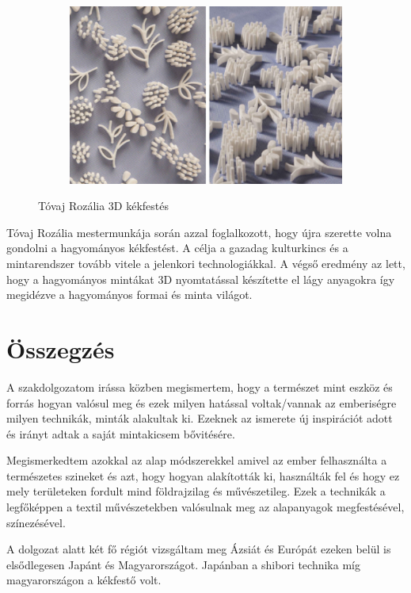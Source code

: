 \documentclass[fontsize=12pt, appendixprefix=true]{scrreprt}
\begin{document}
\begin{figure}[ht!]
	\begin{subfigure}[b]{0.3\linewidth}
		\includegraphics[width=\linewidth]{img/tr_03.png}
		\caption{}
	  \end{subfigure}
	\caption{Tóvaj Rozália 3D kékfestés}
	\label{fig:tr}
  \end{figure}

  Tóvaj Rozália mestermunkája \cite{tovaj2018} során azzal foglalkozott, hogy újra szerette volna gondolni a hagyományos kékfestést. A célja a gazadag kulturkincs és a mintarendszer tovább vitele a jelenkori technologiákkal. A végső eredmény az lett, hogy a hagyományos mintákat 3D nyomtatással készítette el lágy anyagokra így megidézve a hagyományos formai és minta világot.

\chapter{Összegzés} 
A szakdolgozatom irássa közben megismertem, hogy a természet mint eszköz és forrás hogyan valósul meg és ezek milyen hatással voltak/vannak az emberiségre milyen technikák, minták alakultak ki.
Ezeknek az ismerete új inspirációt adott és irányt adtak a saját mintakicsem bővitésére.

Megismerkedtem azokkal az alap módszerekkel amivel az ember felhasználta a természetes szineket és azt, hogy hogyan alakították ki, használták fel és hogy ez mely területeken fordult mind földrajzilag és művészetileg.
Ezek a technikák a legfőképpen a textil művészetekben valósulnak meg az alapanyagok megfestésével, színezésével.

A dolgozat alatt két fő régiót vizsgáltam meg Ázsiát és Európát ezeken belül is elsődlegesen Japánt és Magyarországot. Japánban a shibori technika míg magyarországon  a kékfestő volt.
\end{document}

